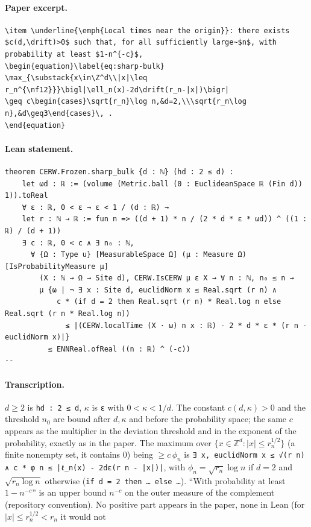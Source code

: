 \paragraph{Paper excerpt.}
\begin{verbatim}
\item \underline{\emph{Local times near the origin}}: there exists $c(d,\drift)>0$ such that, for all sufficiently large~$n$, with probability at least $1-n^{-c}$,
\begin{equation}\label{eq:sharp-bulk}
\max_{\substack{x\in\Z^d\\|x|\leq r_n^{\nf12}}}\bigl|\ell_n(x)-2d\drift(r_n-|x|)\bigr|
\geq c\begin{cases}\sqrt{r_n}\log n,&d=2,\\\sqrt{r_n\log n},&d\geq3\end{cases}\, .
\end{equation}
\end{verbatim}
\paragraph{Lean statement.}
\begin{verbatim}
theorem CERW.Frozen.sharp_bulk {d : ℕ} (hd : 2 ≤ d) :
    let ωd : ℝ := (volume (Metric.ball (0 : EuclideanSpace ℝ (Fin d)) 1)).toReal
    ∀ ε : ℝ, 0 < ε → ε < 1 / (d : ℝ) →
    let r : ℕ → ℝ := fun n => ((d + 1) * n / (2 * d * ε * ωd)) ^ ((1 : ℝ) / (d + 1))
    ∃ c : ℝ, 0 < c ∧ ∃ n₀ : ℕ,
      ∀ {Ω : Type u} [MeasurableSpace Ω] (μ : Measure Ω) [IsProbabilityMeasure μ]
        (X : ℕ → Ω → Site d), CERW.IsCERW μ ε X → ∀ n : ℕ, n₀ ≤ n →
        μ {ω | ¬ ∃ x : Site d, euclidNorm x ≤ Real.sqrt (r n) ∧
            c * (if d = 2 then Real.sqrt (r n) * Real.log n else Real.sqrt (r n * Real.log n))
              ≤ |(CERW.localTime (X · ω) n x : ℝ) - 2 * d * ε * (r n - euclidNorm x)|}
          ≤ ENNReal.ofReal ((n : ℝ) ^ (-c))
--
\end{verbatim}
\paragraph{Transcription.}
$d\ge2$ is \texttt{hd : 2 ≤ d}, $\kappa$ is \texttt{ε} with $0<\kappa<1/d$. The constant $c(d,\kappa)>0$ and the threshold $n_0$ are bound after $d,\kappa$ and before the probability space; the same $c$ appears as the multiplier in the deviation threshold and in the exponent of the probability, exactly as in the paper. The maximum over $\{x\in\mathbb Z^d:|x|\le r_n^{1/2}\}$ (a finite nonempty set, it contains $0$) being $\ge c\,\phi_n$ is \texttt{∃ x, euclidNorm x ≤ √(r n) ∧ c * φ n ≤ |ℓ_n(x) - 2dε(r n - |x|)|}, with $\phi_n=\sqrt{r_n}\log n$ if $d=2$ and $\sqrt{r_n\log n}$ otherwise (\texttt{if d = 2 then … else …}). ``With probability at least $1-n^{-c}$'' is an upper bound $n^{-c}$ on the outer measure of the complement (repository convention). No positive part appears in the paper, none in Lean (for $|x|\le r_n^{1/2}<r_n$ it would not
